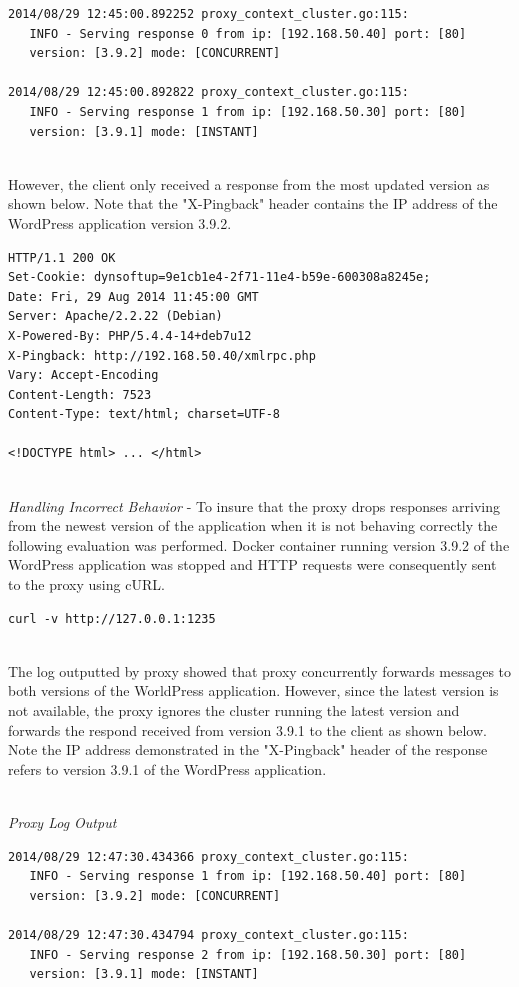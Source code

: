 \documentclass[a4paper,11pt,twoside]{report}
\begin{document}
\begin{lstlisting}[language=terminal]
2014/08/29 12:45:00.892252 proxy_context_cluster.go:115:     
   INFO - Serving response 0 from ip: [192.168.50.40] port: [80] 
   version: [3.9.2] mode: [CONCURRENT]

2014/08/29 12:45:00.892822 proxy_context_cluster.go:115:     
   INFO - Serving response 1 from ip: [192.168.50.30] port: [80] 
   version: [3.9.1] mode: [INSTANT]
\end{lstlisting}

\noindent\\
However, the client only received a response from the most updated version as shown below. Note that the "X-Pingback" header contains the IP address of the WordPress application version 3.9.2. \smallskip

\begin{lstlisting}[language=terminal]
HTTP/1.1 200 OK
Set-Cookie: dynsoftup=9e1cb1e4-2f71-11e4-b59e-600308a8245e;
Date: Fri, 29 Aug 2014 11:45:00 GMT
Server: Apache/2.2.22 (Debian)
X-Powered-By: PHP/5.4.4-14+deb7u12
X-Pingback: http://192.168.50.40/xmlrpc.php
Vary: Accept-Encoding
Content-Length: 7523
Content-Type: text/html; charset=UTF-8

<!DOCTYPE html> ... </html>
\end{lstlisting}

\noindent\\
\textit{Handling Incorrect Behavior} - To insure that the proxy drops responses arriving from the newest version of the application when it is not behaving correctly the following evaluation was performed. Docker container running version 3.9.2 of the WordPress application was stopped and HTTP requests were consequently sent to the proxy using cURL.\smallskip

\begin{lstlisting}[language=terminal]
curl -v http://127.0.0.1:1235
\end{lstlisting}

\noindent\\
The log outputted by proxy showed that proxy concurrently forwards messages to both versions of the WorldPress application. However, since the latest version is not available, the proxy ignores the cluster running the latest version and forwards the respond received from version 3.9.1 to the client as shown below. Note the IP address demonstrated in the "X-Pingback" header of the response refers to version 3.9.1 of the WordPress application.    

\noindent\\
\textit{Proxy Log Output}
\begin{lstlisting}[language=terminal]
2014/08/29 12:47:30.434366 proxy_context_cluster.go:115:     
   INFO - Serving response 1 from ip: [192.168.50.40] port: [80] 
   version: [3.9.2] mode: [CONCURRENT]
   
2014/08/29 12:47:30.434794 proxy_context_cluster.go:115:     
   INFO - Serving response 2 from ip: [192.168.50.30] port: [80] 
   version: [3.9.1] mode: [INSTANT]
\end{lstlisting}
\end{document}
